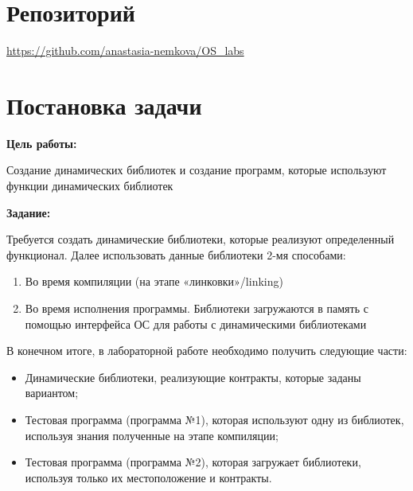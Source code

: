 \documentclass[a4paper, 14pt]{article}
\begin{document}
\section*{Репозиторий}   
\vspace{2ex}
\url{https://github.com/anastasia-nemkova/OS_labs}

\section*{Постановка задачи}   
\textbf{Цель работы:}
\vspace{2ex}

Создание динамических библиотек и создание программ, которые используют функции динамических библиотек

\vspace{4ex}
\textbf{Задание:}
\vspace{2ex}

Требуется создать динамические библиотеки, которые реализуют определенный функционал. 
Далее использовать данные библиотеки 2-мя способами:
\begin{enumerate}
    \item Во время компиляции (на этапе «линковки»/linking)
    \item Во время исполнения программы. Библиотеки загружаются в память с помощью интерфейса ОС для работы с динамическими библиотеками
\end{enumerate}
В конечном итоге, в лабораторной работе необходимо получить следующие части:
\begin{itemize}
    \item Динамические библиотеки, реализующие контракты, которые заданы вариантом;
    \item Тестовая программа (программа №1), которая используют одну из библиотек, используя знания полученные на этапе компиляции;
    \item Тестовая программа (программа №2), которая загружает библиотеки, используя только их местоположение и контракты.
\end{itemize}
\end{document}
